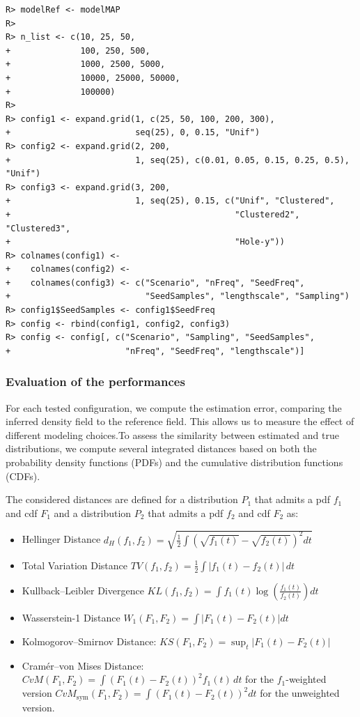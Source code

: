 \documentclass[
]{article}
\begin{document}
\begin{verbatim}
R> modelRef <- modelMAP
R> 
R> n_list <- c(10, 25, 50, 
+              100, 250, 500, 
+              1000, 2500, 5000, 
+              10000, 25000, 50000,
+              100000)
R> 
R> config1 <- expand.grid(1, c(25, 50, 100, 200, 300),
+                         seq(25), 0, 0.15, "Unif")
R> config2 <- expand.grid(2, 200, 
+                         1, seq(25), c(0.01, 0.05, 0.15, 0.25, 0.5), "Unif")
R> config3 <- expand.grid(3, 200, 
+                         1, seq(25), 0.15, c("Unif", "Clustered", 
+                                             "Clustered2",  "Clustered3",
+                                             "Hole-y"))
R> colnames(config1) <-
+    colnames(config2) <-
+    colnames(config3) <- c("Scenario", "nFreq", "SeedFreq", 
+                           "SeedSamples", "lengthscale", "Sampling")
R> config1$SeedSamples <- config1$SeedFreq
R> config <- rbind(config1, config2, config3)
R> config <- config[, c("Scenario", "Sampling", "SeedSamples",  
+                       "nFreq", "SeedFreq", "lengthscale")]
\end{verbatim}

\subsubsection{Evaluation of the performances}\label{evaluation-of-the-performances}

For each tested configuration, we compute the estimation error, comparing the inferred density field to the reference field. This allows us to measure the effect of different modeling choices.To assess the similarity between estimated and true distributions, we compute several integrated distances based on both the probability density functions (PDFs) and the cumulative distribution functions (CDFs).

The considered distances are defined for a distribution \(P_1\) that admits a pdf \(f_1\) and cdf \(F_1\) and a distribution \(P_2\) that admits a pdf \(f_2\) and cdf \(F_2\) as:

\begin{itemize}
\item
  Hellinger Distance \(d_H(f_1, f_2) = \sqrt{\frac{1}{2} \int \left( \sqrt{f_1(t)} - \sqrt{f_2(t)} \right)^2 dt}\)
\item
  Total Variation Distance \(TV(f_1, f_2) = \frac{1}{2} \int \left| f_1(t) - f_2(t) \right| \,dt\)
\item
  Kullback--Leibler Divergence \(KL(f_1, f_2) = \int f_1(t) \log \left( \frac{f_1(t)}{f_2(t)} \right) dt\)
\item
  Wasserstein-1 Distance \(W_1(F_1, F_2) = \int \left| F_1(t) - F_2(t) \right| dt\)
\item
  Kolmogorov--Smirnov Distance: \(KS(F_1, F_2) = \sup_t \left| F_1(t) - F_2(t) \right|\)
\item
  Cramér--von Mises Distance: \(CvM(F_1, F_2) = \int \left( F_1(t) - F_2(t) \right)^2 f_1(t) \, dt\) for the \(f_1\)-weighted version
  \(CvM_{\text{sym}}(F_1, F_2) = \int \left( F_1(t) - F_2(t) \right)^2 dt\) for the unweighted version.
\end{itemize}
\end{document}

